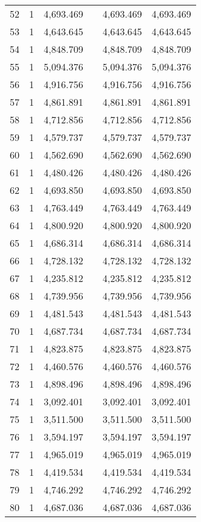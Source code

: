 \begin{table}[!htbp]
\begin{tabular}{@{\extracolsep{5pt}}lccccc}
52 & 1 & 4,693.469 &  & 4,693.469 & 4,693.469 \\ 
53 & 1 & 4,643.645 &  & 4,643.645 & 4,643.645 \\ 
54 & 1 & 4,848.709 &  & 4,848.709 & 4,848.709 \\ 
55 & 1 & 5,094.376 &  & 5,094.376 & 5,094.376 \\ 
56 & 1 & 4,916.756 &  & 4,916.756 & 4,916.756 \\ 
57 & 1 & 4,861.891 &  & 4,861.891 & 4,861.891 \\ 
58 & 1 & 4,712.856 &  & 4,712.856 & 4,712.856 \\ 
59 & 1 & 4,579.737 &  & 4,579.737 & 4,579.737 \\ 
60 & 1 & 4,562.690 &  & 4,562.690 & 4,562.690 \\ 
61 & 1 & 4,480.426 &  & 4,480.426 & 4,480.426 \\ 
62 & 1 & 4,693.850 &  & 4,693.850 & 4,693.850 \\ 
63 & 1 & 4,763.449 &  & 4,763.449 & 4,763.449 \\ 
64 & 1 & 4,800.920 &  & 4,800.920 & 4,800.920 \\ 
65 & 1 & 4,686.314 &  & 4,686.314 & 4,686.314 \\ 
66 & 1 & 4,728.132 &  & 4,728.132 & 4,728.132 \\ 
67 & 1 & 4,235.812 &  & 4,235.812 & 4,235.812 \\ 
68 & 1 & 4,739.956 &  & 4,739.956 & 4,739.956 \\ 
69 & 1 & 4,481.543 &  & 4,481.543 & 4,481.543 \\ 
70 & 1 & 4,687.734 &  & 4,687.734 & 4,687.734 \\ 
71 & 1 & 4,823.875 &  & 4,823.875 & 4,823.875 \\ 
72 & 1 & 4,460.576 &  & 4,460.576 & 4,460.576 \\ 
73 & 1 & 4,898.496 &  & 4,898.496 & 4,898.496 \\ 
74 & 1 & 3,092.401 &  & 3,092.401 & 3,092.401 \\ 
75 & 1 & 3,511.500 &  & 3,511.500 & 3,511.500 \\ 
76 & 1 & 3,594.197 &  & 3,594.197 & 3,594.197 \\ 
77 & 1 & 4,965.019 &  & 4,965.019 & 4,965.019 \\ 
78 & 1 & 4,419.534 &  & 4,419.534 & 4,419.534 \\ 
79 & 1 & 4,746.292 &  & 4,746.292 & 4,746.292 \\ 
80 & 1 & 4,687.036 &  & 4,687.036 & 4,687.036 \\ 

\end{tabular}
\end{table}
